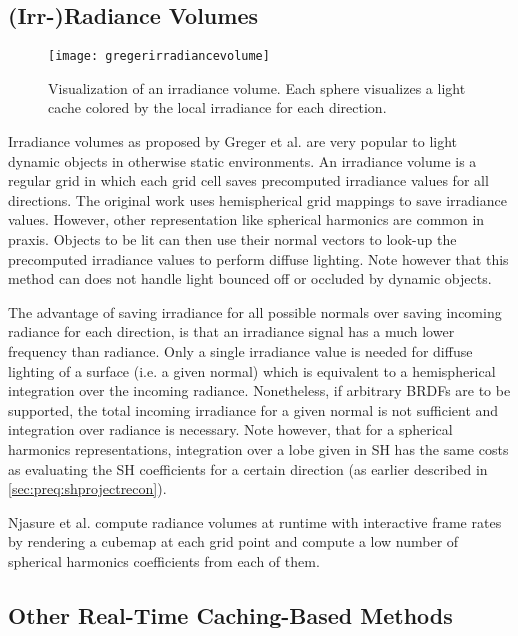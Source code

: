 \documentclass[thesis.tex]{subfiles}
\begin{document}
\subsection{(Irr-)Radiance Volumes}
\begin{figure}[h]
	\centering
	\texttt{[image: gregerirradiancevolume]}
	\caption{\cite{bib:irradiancevolume} Visualization of an irradiance volume. Each sphere visualizes a light cache colored by the local irradiance for each direction. } \label{fig:irradiancevolume}
\end{figure}
Irradiance volumes as proposed by Greger et al. \cite{bib:irradiancevolume} are very popular to light dynamic objects in otherwise static environments.
An irradiance volume is a regular grid in which each grid cell saves precomputed irradiance values for all directions.
The original work uses hemispherical grid mappings to save irradiance values.
However, other representation like spherical harmonics are common in praxis.
Objects to be lit can then use their normal vectors to look-up the precomputed irradiance values to perform diffuse lighting.
Note however that this method can does not handle light bounced off or occluded by dynamic objects.

The advantage of saving irradiance for all possible normals over saving incoming radiance for each direction, is that an irradiance signal has a much lower frequency than radiance.
Only a single irradiance value is needed for diffuse lighting of a surface (i.e. a given normal) which is equivalent to a hemispherical integration over the incoming radiance.
Nonetheless, if arbitrary BRDFs are to be supported, the total incoming irradiance for a given normal is not sufficient and integration over radiance is necessary.
Note however, that for a spherical harmonics representations, integration over a lobe given in SH has the same costs as evaluating the SH coefficients for a certain direction (as earlier described in \autoref{sec:preq:shprojectrecon}).

Njasure et al. \cite{bib:nijasure:rtirradiancevol} compute radiance volumes at runtime with interactive frame rates by rendering a cubemap at each grid point and compute a low number of spherical harmonics coefficients from each of them.

\subsection{Other Real-Time Caching-Based Methods}
\end{document}
